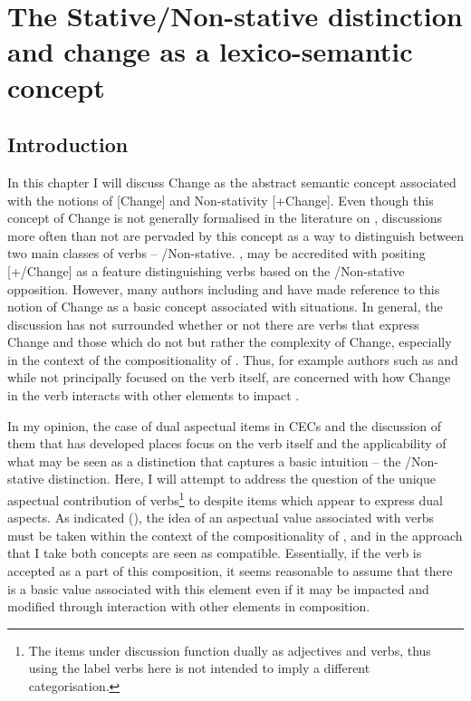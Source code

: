 \chapter{The Stative/Non-stative distinction and
  change as a lexico-semantic concept}\label{sec:4}\label{ch:4}

\section{Introduction}\label{sec:4.0}

In this chapter I will discuss Change as the abstract semantic concept
associated with the notions of  [\textminus Change] and Non-stativity [+Change].  Even though this concept of Change is not generally
formalised in the literature on , discussions more often than
not are pervaded by this concept as a way to distinguish between two
main classes of verbs – \slash Non-stative.  \citet{Verkuyl1993,Verkuyl1999},
may be accredited with positing [+/\textminus Change] as a feature
distinguishing verbs based on the \slash Non-stative opposition.
However, many authors including \citet{Vendler1967, Comrie1976, Mourelatos1981, Jackendoff1996} and
\citet{Krifka1998} have made reference to this notion of Change as a
basic concept associated with situations.  In general, the discussion
has not surrounded whether or not there are verbs that express Change
and those which do not but rather the complexity of Change, especially
in the context of the compositionality of .  Thus, for example
authors such as \textcite{Verkuyl1993, Verkuyl1999, Tenny1994, Jackendoff1996} 
and \citet{Krifka1998,Krifka2001} while not principally
focused on the verb itself, are concerned with how Change in the verb
interacts with other elements to impact .

In my opinion, the case of dual aspectual items in CECs and the
discussion of them that has developed places focus on the verb itself
and the applicability of what may be seen as a distinction that
captures a basic intuition -- the \slash Non-stative distinction.  Here, I will attempt to address the question of the unique aspectual
contribution of verbs\footnote{The items under discussion function
  dually as adjectives and verbs, thus using the label verbs here is
  not intended to imply a different categorisation.}  to 
despite items which appear to express dual aspects.  As indicated
(), the idea of an aspectual value associated with verbs
must be taken within the context of the compositionality of ,
and in the approach that I take both concepts are seen as compatible.
Essentially, if the verb is accepted as a part of this composition, it
seems reasonable to assume that there is a basic value associated with
this element even if it may be impacted and modified through
interaction with other elements in composition.

